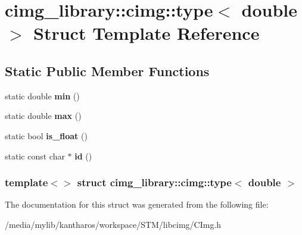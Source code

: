 \hypertarget{structcimg__library_1_1cimg_1_1type_3_01double_01_4}{
\section{cimg\_\-library::cimg::type$<$ double $>$ Struct Template Reference}
\label{structcimg__library_1_1cimg_1_1type_3_01double_01_4}
}
\subsection*{Static Public Member Functions}
\begin{DoxyCompactItemize}
\item 
\hypertarget{structcimg__library_1_1cimg_1_1type_3_01double_01_4_a44c8609817f59e8705504bf061849ac5}{
static double {\bfseries min} ()}
\label{structcimg__library_1_1cimg_1_1type_3_01double_01_4_a44c8609817f59e8705504bf061849ac5}

\item 
\hypertarget{structcimg__library_1_1cimg_1_1type_3_01double_01_4_ad651f1f463b89c934f79a6844986ac12}{
static double {\bfseries max} ()}
\label{structcimg__library_1_1cimg_1_1type_3_01double_01_4_ad651f1f463b89c934f79a6844986ac12}

\item 
\hypertarget{structcimg__library_1_1cimg_1_1type_3_01double_01_4_a95b4f65e708f0da19767b31a42d11221}{
static bool {\bfseries is\_\-float} ()}
\label{structcimg__library_1_1cimg_1_1type_3_01double_01_4_a95b4f65e708f0da19767b31a42d11221}

\item 
\hypertarget{structcimg__library_1_1cimg_1_1type_3_01double_01_4_a1c46001773cc5b71215d72def3d6e93b}{
static const char $\ast$ {\bfseries id} ()}
\label{structcimg__library_1_1cimg_1_1type_3_01double_01_4_a1c46001773cc5b71215d72def3d6e93b}

\end{DoxyCompactItemize}
\subsubsection*{template$<$$>$ struct cimg\_\-library::cimg::type$<$ double $>$}



The documentation for this struct was generated from the following file:\begin{DoxyCompactItemize}
\item 
/media/mylib/kantharos/workspace/STM/libcimg/CImg.h\end{DoxyCompactItemize}
